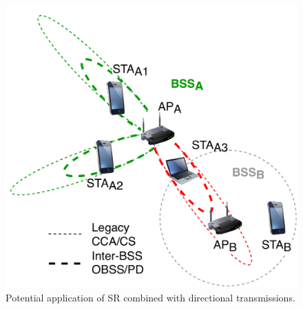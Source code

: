 \documentclass{ieeeaccess}
\begin{document}
\begin{figure}[ht!]
	\centering        
	\includegraphics[width=0.8\columnwidth]{sr_and_beamforming}
	\caption{Potential application of SR combined with directional transmissions.}
	\label{fig:sr_and_beamforming}
\end{figure}
\end{document}
